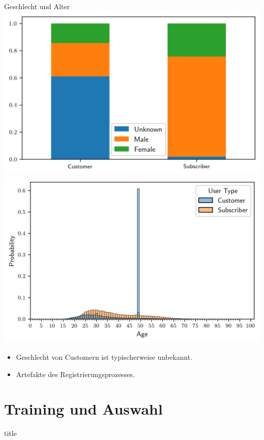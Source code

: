 \begin{frame}{Geschlecht und Alter}
\centering
\includegraphics[height=0.5\textheight]{../Images/GenderComparison}
\includegraphics[height=0.5\textheight]{../Images/AgeDistribution}
{
\begin{itemize}
\item Geschlecht von Customern ist typischerweise unbekannt.
\item Artefakte des Registrierungsprozesses.
\end{itemize}
}
\end{frame}

\section{Training und Auswahl}

\begin{frame}
\begin{beamercolorbox}[sep=8pt,center]{title}
\end{beamercolorbox}
\end{frame}

